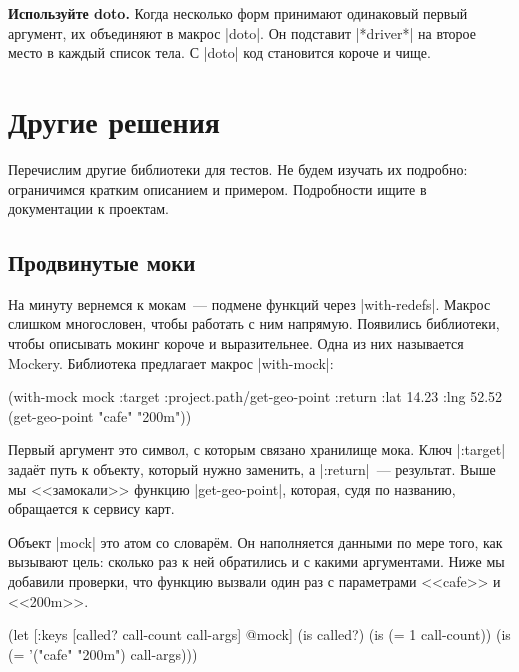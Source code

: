 
\textbf{Используйте doto.} Когда несколько форм принимают одинаковый первый
аргумент, их объединяют в макрос \spverb|doto|. Он подставит \spverb|*driver*|
на второе место в каждый список тела. С \spverb|doto| код становится короче и
чище.

\section{Другие решения}

Перечислим другие библиотеки для тестов. Не будем изучать их подробно:
ограничимся кратким описанием и примером. Подробности ищите в документации к
проектам.

\subsection{Продвинутые моки}


На минуту вернемся к мокам~--- подмене функций через
\spverb|with-redefs|. Макрос слишком многословен, чтобы работать с ним
напрямую. Появились библиотеки, чтобы описывать мокинг короче и
выразительнее. Одна из них называется Mockery.
Библиотека предлагает макрос \spverb|with-mock|:

\begin{english}
  \begin{clojure}
(with-mock mock
  {:target :project.path/get-geo-point
   :return {:lat 14.23 :lng 52.52}}
  (get-geo-point "cafe" "200m"))
  \end{clojure}
\end{english}

Первый аргумент это символ, с которым связано хранилище мока. Ключ \spverb|:target|
задаёт путь к объекту, который нужно заменить, а \spverb|:return|~---
результат. Выше мы <<замокали>> функцию \spverb|get-geo-point|, которая, судя по
названию, обращается к сервису карт.

Объект \spverb|mock| это атом со словарём. Он наполняется данными по мере
того, как вызывают цель: сколько раз к ней обратились и с какими
аргументами. Ниже мы добавили проверки, что функцию вызвали один раз с
параметрами <<cafe>> и <<200m>>.

\begin{english}
  \begin{clojure}
(let [{:keys [called? call-count call-args]} @mock]
  (is called?)
  (is (= 1 call-count))
  (is (= '("cafe" "200m") call-args)))
  \end{clojure}
\end{english}

